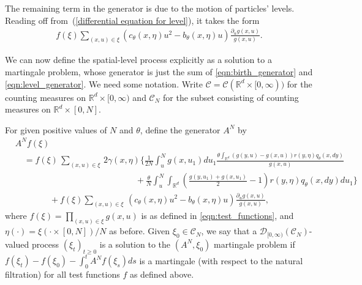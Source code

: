 \documentclass[EJP]{ejpecp} %
\newcommand{\IR}{\mathbb R}
\newcommand{\lp}{\xi}              %
\begin{document}
The remaining term in the generator is due to the motion of particles' levels.
Reading off from~(\ref{differential equation for level}),
it takes the form
\begin{align} \label{eqn:level_generator}
    f(\lp)
    \sum_{(x, u) \in \lp}
    \left(
        c_\theta(x, \eta) u^2
        -
        b_\theta(x, \eta) u
    \right)
    \frac{\partial_u g(x,u)}{g(x,u)} .
\end{align}


We can now define the spatial-level process
explicitly as a solution to a martingale problem,
whose generator is just the sum of
\eqref{eqn:birth_generator} and \eqref{eqn:level_generator}.
We need some notation. 
Write ${\mathcal C}={\mathcal C}(\IR^d\times [0,\infty))$ for the counting measures 
on $\IR^d\times [0,\infty)$ and ${\mathcal C}_N$ for the subset consisting of 
counting measures on $\IR^d\times [0,N]$.

\begin{definition}
    \label{defn:lookdown_mgale}
For given positive values of $N$ and $\theta$, define the generator $A^N$
by
\begin{equation}
	\label{eqn:lookdown_generator}
\begin{split}
& A^{N}f(\lp ) \\
&\quad =
    f(\lp)
    \,\sum_{(x,u)\in \lp}\,
    2 \gamma(x, \eta)
    \Bigg\{ \frac{1}{2N} \int_u^N g(x,u_1) du_1
            \frac{
                \theta \int_{\IR^d}
                (g(y,u) - g(x,u))
                r(y, \eta) q_{\theta}(x,dy)
            }{ g(x,u) }
        \\
    &\qquad\qquad\qquad\qquad\qquad\qquad\qquad {} +
        \frac{\theta}{N} \int_u^N
        \int_{\IR^d}\left(
            \frac{ g(y,u_1) + g(x,u_1) }{ 2 } - 1
        \right)
        r(y, \eta) q_{\theta}(x,dy)
        du_1
    \Bigg\}\\
    &\qquad\qquad {} +
    f(\lp) \sum_{(x,u)\in\lp}\,
    \left(
        c_\theta(x,\eta) u^2 - b_{\theta}(x,\eta)u
    \right)
    \frac{\partial_u g(x,u)}{g(x,u)}
    ,
\end{split}
\end{equation}
where $f(\lp) = \prod_{(x, u) \in \lp} g(x, u)$ is as defined in \eqref{eqn:test_functions},
and $\eta(\cdot) = \lp(\cdot \times [0, N]) / N$
as before. 
Given $\lp_0 \in {\mathcal C}_N$, 
we say that a ${\mathcal D}_{[0,\infty)}({\mathcal C}_N)$-valued process 
$(\xi_t)_{t \ge 0}$ is a solution to the $(A^N, \lp_0)$ martingale problem
if $f(\lp_t) - f(\lp_0)-\int_0^t A^N f(\lp_s) ds$ is a martingale (with 
respect to the natural filtration) for all 
test functions $f$ as defined above.
\end{definition}
\end{document}

